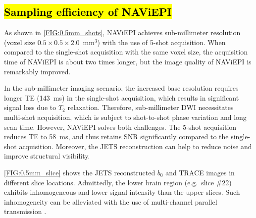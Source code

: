 \documentclass[preprint,12pt,authoryear,review]{elsarticle}
\begin{document}
    \subsection{\hl{Sampling efficiency of NAViEPI}}

    As shown in \cref{FIG:0.5mm_shots},
    NAViEPI achieves sub-millimeter resolution
    (voxel size $0.5\times0.5\times2.0$~mm$^3$)
    with the use of 5-shot acquisition.
    When compared to the single-shot acquisition
    with the same voxel size,
    the acquisition time of NAViEPI is about two times longer,
    but the image quality of NAViEPI is remarkably improved.

    In the sub-millimeter imaging scenario,
    the increased base resolution requires longer TE (\SI{143}{\ms})
    in the single-shot acquisition,
    which results in significant signal loss due to $T_2$ relaxation.
    Therefore, sub-millimeter DWI necessitates multi-shot acquisition,
    which is subject to shot-to-shot phase variation and long scan time.
    However, NAViEPI solves both challenges.
    The 5-shot acquisition reduces TE to \SI{58}{\ms},
    and thus retains SNR significantly
    compared to the single-shot acquisition.
    Moreover, the JETS reconstruction can help to reduce noise
    and improve structural visibility.

    \cref{FIG:0.5mm_slice} shows the JETS reconstructed $b_0$
    and TRACE images in different slice locations.
    Admittedly, the lower brain region (e.g.~slice \#22)
    exhibits inhomogeneous and lower signal intensity
    than the upper slices.
    Such inhomogeneity can be alleviated with
    the use of multi-channel parallel transmission
    \citep{katscher_2003_ptx,grissom_2010_ptx}.
\end{document}
